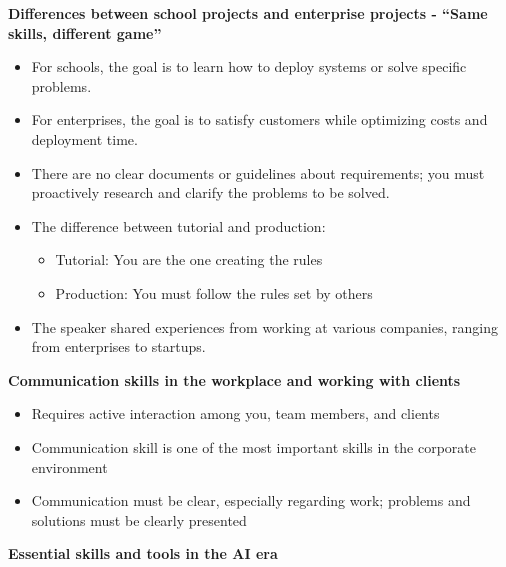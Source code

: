 \vspace{0.5em}\noindent\textbf{Differences between school projects and enterprise projects -
``Same skills, different
game''}\par

\begin{itemize}
\tightlist
\item
  For schools, the goal is to learn how to deploy systems or solve
  specific problems.
\item
  For enterprises, the goal is to satisfy customers while optimizing
  costs and deployment time.
\item
  There are no clear documents or guidelines about requirements; you
  must proactively research and clarify the problems to be solved.
\item
  The difference between tutorial and production:

  \begin{itemize}
  \tightlist
  \item
    Tutorial: You are the one creating the rules
  \item
    Production: You must follow the rules set by others
  \end{itemize}
\item
  The speaker shared experiences from working at various companies,
  ranging from enterprises to startups.
\end{itemize}

\vspace{0.5em}\noindent\textbf{Communication skills in the workplace and working with
clients}\par

\begin{itemize}
\tightlist
\item
  Requires active interaction among you, team members, and clients
\item
  Communication skill is one of the most important skills in the
  corporate environment
\item
  Communication must be clear, especially regarding work; problems and
  solutions must be clearly presented
\end{itemize}

\vspace{0.5em}\noindent\textbf{Essential skills and tools in the AI
era}\par

